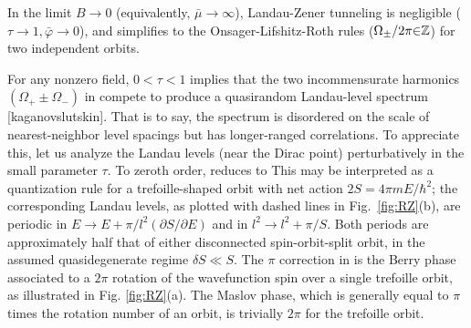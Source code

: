 \documentclass[aps, prb, showpacs, twocolumn, notitlepage, superscriptaddress]{revtex4-1}
\begin{document}

In the limit $B{\rightarrow}0$ (equivalently, $\bar{\mu}{\rightarrow} \infty$), Landau-Zener tunneling is negligible ($\tau{\rightarrow}1,\bar{\varphi}{\rightarrow}0$), and  simplifies to the Onsager-Lifshitz-Roth rules ($\Omega_{\pm}/2\pi{\in}\mathbb{Z}$) for  two independent orbits.

For any nonzero field, $0{<}\tau{<}1$ implies that the two incommensurate harmonics $(\Omega_+{\pm}\Omega_-)$ in  compete to produce a quasirandom Landau-level spectrum [kaganovslutskin]. That is to say, the spectrum is disordered on the scale of nearest-neighbor level spacings but has longer-ranged correlations. To appreciate this, let us analyze the Landau levels (near the Dirac point) perturbatively in the small parameter $\tau$. To zeroth order,  reduces to
 This may be interpreted as a quantization rule for a trefoille-shaped orbit with net action $2S{=}4\pi m E{/\hbar^2}$; the corresponding Landau levels, as plotted with dashed lines in Fig.\ \ref{fig:RZ}(b), are  periodic in $E{\rightarrow}E{+}\pi/l^2(\partial S/\partial E)$ and in $l^2{\rightarrow}l^2{+}\pi/S$. Both periods are approximately half that of either disconnected spin-orbit-split orbit, in the assumed quasidegenerate regime $\delta S{\ll}S$. The $\pi$ correction in  is the Berry phase associated to a $2\pi$ rotation of the wavefunction spin over a single trefoille orbit, as illustrated in Fig. \ref{fig:RZ}(a). The Maslov phase, which is generally equal to $\pi$ times the rotation number of an orbit, is trivially $2\pi$ for the trefoille orbit.


\end{document}
